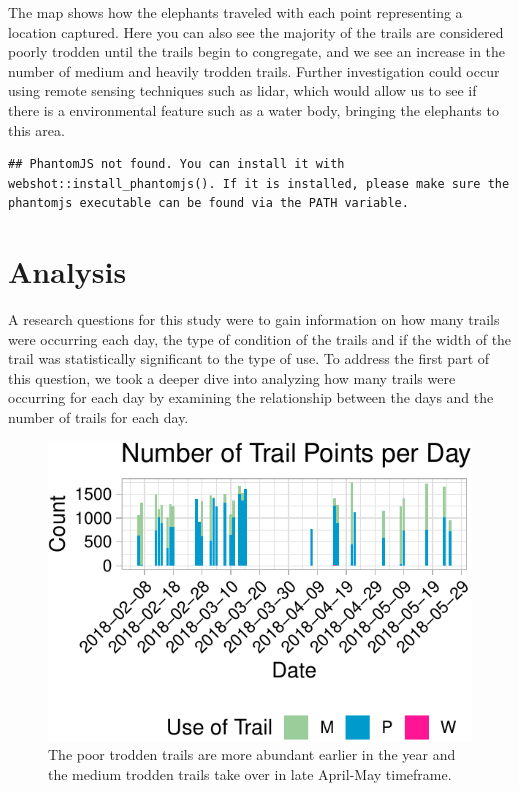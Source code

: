 \documentclass[12pt,]{article}
\begin{document}
The map shows how the elephants traveled with each point representing a
location captured. Here you can also see the majority of the trails are
considered poorly trodden until the trails begin to congregate, and we
see an increase in the number of medium and heavily trodden trails.
Further investigation could occur using remote sensing techniques such
as lidar, which would allow us to see if there is a environmental
feature such as a water body, bringing the elephants to this area.

\begin{verbatim}
## PhantomJS not found. You can install it with webshot::install_phantomjs(). If it is installed, please make sure the phantomjs executable can be found via the PATH variable.
\end{verbatim}

\newpage

\hypertarget{analysis}{%
\section{Analysis}\label{analysis}}

A research questions for this study were to gain information on how many
trails were occurring each day, the type of condition of the trails and
if the width of the trail was statistically significant to the type of
use. To address the first part of this question, we took a deeper dive
into analyzing how many trails were occurring for each day by examining
the relationship between the days and the number of trails for each day.

\begin{figure}

\includegraphics{Project_Template_files/figure-latex/unnamed-chunk-2-1} \hfill{}

\caption{The poor trodden trails are more abundant earlier in the year and the medium trodden trails take over in late April-May timeframe.}\label{fig:unnamed-chunk-2}
\end{figure}
\end{document}
